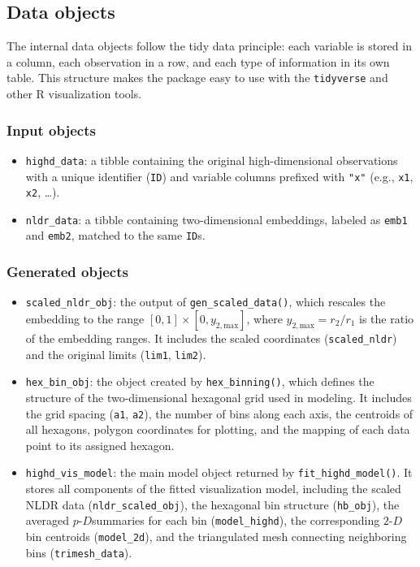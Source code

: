 \documentclass[
  11pt,
  a4paper,
]{report}
\newcommand\pD{$p\text{-}D$}
\newcommand{\twoD}{$2\text{-}D$}
\begin{document}
\subsection{Data objects}\label{data-objects}

The internal data objects follow the tidy data principle: each variable
is stored in a column, each observation in a row, and each type of
information in its own table. This structure makes the package easy to
use with the \texttt{tidyverse} and other R visualization tools.

\subsubsection{Input objects}\label{input-objects}

\begin{itemize}
\item
  \texttt{highd\_data}: a tibble containing the original
  high-dimensional observations with a unique identifier (\texttt{ID})
  and variable columns prefixed with \texttt{"x"} (e.g., \texttt{x1},
  \texttt{x2}, \ldots).
\item
  \texttt{nldr\_data}: a tibble containing two-dimensional embeddings,
  labeled as \texttt{emb1} and \texttt{emb2}, matched to the same
  \texttt{ID}s.
\end{itemize}

\subsubsection{Generated objects}\label{generated-objects}

\begin{itemize}
\item
  \texttt{scaled\_nldr\_obj}: the output of
  \texttt{gen\_scaled\_data()}, which rescales the embedding to the
  range \([0, 1] \times [0, y_{2,\text{max}}]\), where
  \(y_{2,\text{max}} = r_2 / r_1\) is the ratio of the embedding ranges.
  It includes the scaled coordinates (\texttt{scaled\_nldr}) and the
  original limits (\texttt{lim1}, \texttt{lim2}).
\item
  \texttt{hex\_bin\_obj}: the object created by \texttt{hex\_binning()},
  which defines the structure of the two-dimensional hexagonal grid used
  in modeling. It includes the grid spacing (\texttt{a1}, \texttt{a2}),
  the number of bins along each axis, the centroids of all hexagons,
  polygon coordinates for plotting, and the mapping of each data point
  to its assigned hexagon.
\item
  \texttt{highd\_vis\_model}: the main model object returned by
  \texttt{fit\_highd\_model()}. It stores all components of the fitted
  visualization model, including the scaled NLDR data
  (\texttt{nldr\_scaled\_obj}), the hexagonal bin structure
  (\texttt{hb\_obj}), the averaged \pD summaries for each bin
  (\texttt{model\_highd}), the corresponding \twoD bin centroids
  (\texttt{model\_2d}), and the triangulated mesh connecting neighboring
  bins (\texttt{trimesh\_data}).
\end{itemize}
\end{document}

